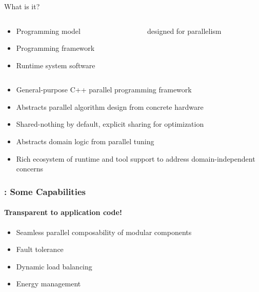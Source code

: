 \begin{frame}
\frametitle{\charm}
\framesubtitle{}
	\begin{block}{What is it?}
	\begin{columns}
	\begin{column}{0.5\textwidth}
		\begin{itemize}
		\item Programming model
		\item Programming framework
		\item Runtime system software
	\end{itemize}
	\end{column}
	\begin{column}{0.3\textwidth}
		{\Large designed for parallelism}
	\end{column}
	\end{columns}
	\end{block}
    \begin{itemize}
        \item General-purpose C++ parallel programming framework
        \item Abstracts parallel algorithm design from concrete hardware
        \item Shared-nothing by default, explicit sharing for optimization
        \item Abstracts domain logic from parallel tuning
        \item Rich ecosystem of runtime and tool support to address domain-independent
          concerns
    \end{itemize}
\end{frame}


\begin{frame}
\frametitle{\charm: Some Capabilities}
\framesubtitle{Transparent to application code!}
    \begin{itemize}
        \item Seamless parallel composability of modular components
        \item Fault tolerance
        \item Dynamic load balancing
        \item Energy management
    \end{itemize}
\end{frame}


